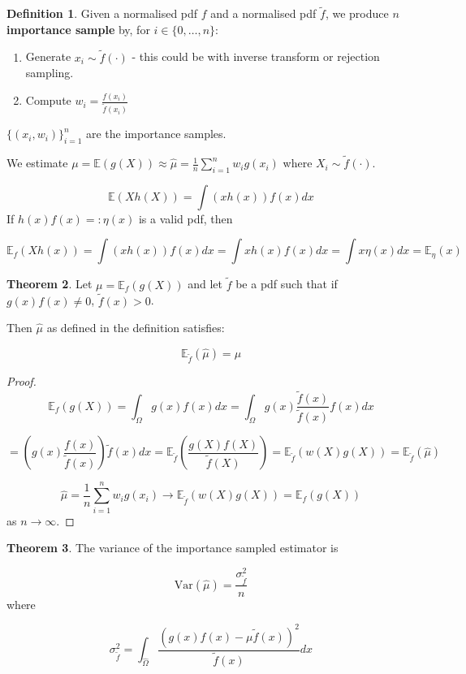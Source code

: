 \documentclass[12pt,a4paper]{article}
\theoremstyle{definition}
\newtheorem{definition}{Definition}[subsection]
\newtheorem{theorem}[definition]{Theorem}
\begin{document}
\begin{definition}
	Given a normalised pdf $f$ and a normalised pdf $\tilde{f}$, we produce $n$ \textbf{importance sample} by, for $i \in \{0, \dots, n\}$:
	\begin{enumerate}
		\item Generate $x_i \sim \tilde{f}(\cdot)$ - this could be with inverse transform or rejection sampling.
		\item Compute $w_i = \frac{f(x_i)}{\tilde{f}(x_i)}$
	\end{enumerate}

	$\{ (x_i, w_i) \}_{i = 1}^n$ are the importance samples.

	We estimate $\mu = \mathbb{E}(g(X)) \approx \hat{\mu} = \frac{1}{n} \sum_{i = 1}^n w_i g(x_i)$ where $X_i \sim \tilde{f}(\cdot)$.

	\[ \mathbb{E}(X h(X)) = \int (x h(x)) f(x) dx \]
	If $h(x) f(x) =: \eta (x)$ is a valid pdf, then

	\[ \mathbb{E}_f (X h(x)) = \int (x h(x)) f(x) dx = \int x h(x) f(x) dx = \int x \eta(x) dx = \mathbb{E}_{\eta} (x) \]
\end{definition}

\begin{theorem}
	Let $\mu = \mathbb{E}_f (g(X))$ and let $\tilde{f}$ be a pdf such that if $g(x) f(x) \ne 0$, $\tilde{f}(x) > 0$.

	Then $\hat{\mu}$ as defined in the definition satisfies:

	\[ \mathbb{E}_{\tilde{f}} (\hat{\mu}) = \mu \]
\end{theorem}

\begin{proof}
	\[ \mathbb{E}_f (g(X)) = \int_{\Omega} g(x) f(x) dx = \int_{\Omega} g(x) \frac{\tilde{f}(x)}{\tilde{f}(x)} f(x) dx \]

	\[ = \left( g(x) \frac{f(x)}{\tilde{f}(x)} \right) \tilde{f}(x) dx = \mathbb{E}_{\tilde{f}} (\frac{g(X) f(X)}{\tilde{f}(X)}) = \mathbb{E}_{\tilde{f}} (w(X) g(X)) = \mathbb{E}_{\tilde{f}} (\hat{\mu}) \]

	\[ \hat{\mu} = \frac{1}{n} \sum_{i = 1}^n w_i g(x_i) \rightarrow \mathbb{E}_{\tilde{f}} (w(X) g(X)) = \mathbb{E}_f (g(X)) \]
	as $n \rightarrow \infty$.
\end{proof}

\begin{theorem}
	The variance of the importance sampled estimator is

	\[ \text{Var} (\hat{\mu}) = \frac{\sigma_{\tilde{f}}^2}{n} \]
	where

	\[ \sigma_{\tilde{f}}^2 = \int_{\hat{\Omega}} \frac{(g(x) f(x) - \mu \tilde{f}(x))^2}{\tilde{f}(x)} dx \]
\end{theorem}
\end{document}
